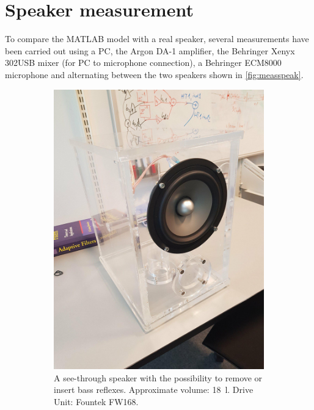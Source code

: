 \chapter{Speaker measurement}
\label{chap:measurement}
To compare the MATLAB model with a real speaker, several measurements have been carried out using a PC, the Argon DA-1 amplifier, the Behringer Xenyx 302USB mixer (for PC to microphone connection), a Behringer ECM8000 microphone and alternating between the two speakers shown in \cref{fig:measspeak}.

\begin{figure}
	\centering
	\begin{subfigure}{.5\textwidth}
		\centering
		\includegraphics[width=.9\linewidth, clip, trim={0 6cm 0 6cm}]{gfx/Speaker_plexi.jpg}
		\caption{A see-through speaker with the possibility to remove or insert bass reflexes. Approximate volume: \SI{18}{\litre}. Drive Unit: Fountek FW168.}
		\label{fig:measspeak1}
	\end{subfigure}%
	\begin{subfigure}{.5\textwidth}
		\centering

\end{subfigure}
\end{figure}
